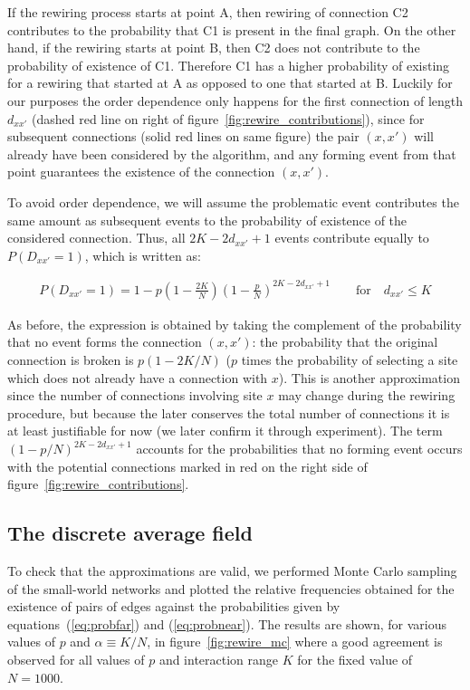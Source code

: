 If the rewiring process starts at point A, then rewiring of connection C2 contributes to the probability that C1 is present in the
final graph. On the other hand, if the rewiring starts at point B, then C2 does not contribute to the probability of existence of C1.
Therefore C1 has a higher probability of existing for a rewiring that started at A as opposed to one that started at B. Luckily for our
purposes the order dependence only happens for the first connection of length $d_{xx'}$ (dashed {\color{red}red} line on right of
figure~\ref{fig:rewire_contributions}), since for subsequent connections (solid {\color{red}red} lines on same figure) the pair
$(x,x')$ will already have been considered by the algorithm, and any forming event from that point guarantees the existence of the
connection $(x,x')$.

To avoid order dependence, we will assume the problematic event contributes the same amount as subsequent events to the probability of
existence of the considered connection. Thus, all $2K-2d_{xx'}+1$ events contribute equally to $P(D_{xx'}=1)$, which is written as:

\begin{align}
    P(D_{xx'}=1) = 1 - p\left(1-\frac{2K}{N}\right)\left(1-\frac{p}{N}\right)^{2K - 2d_{xx'} + 1} \qquad \text{for} \quad d_{xx'} \leq K
    \label{eq:probnear}
\end{align}

\noindent As before, the expression is obtained by taking the complement of the probability that no event forms the connection
$(x,x')$: the probability that the original connection is broken is $p(1-2K/N)$ ($p$ times the probability of selecting a site which
does not already have a connection with $x$). This is another approximation since the number of connections involving site $x$ may
change during the rewiring procedure, but because the later conserves the total number of connections it is at least justifiable for
now (we later confirm it through experiment). The term $(1-p/N)^{2K-2d_{xx'}+1}$ accounts for the probabilities that no forming event
occurs with the potential connections marked in {\color{red}red} on the right side of figure~\ref{fig:rewire_contributions}.

\subsection{The discrete average field}

To check that the approximations are valid, we performed Monte Carlo sampling of the small-world networks and plotted the relative
frequencies obtained for the existence of pairs of edges against the probabilities given by equations~(\ref{eq:probfar}) and
(\ref{eq:probnear}). The results are shown, for various values of $p$ and $\alpha \equiv K/N$, in figure~\ref{fig:rewire_mc} where a
good agreement is observed for all values of $p$ and interaction range $K$ for the fixed value of $N=1000$.

